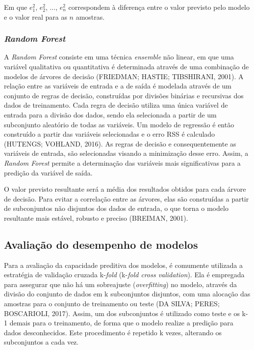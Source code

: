Em que $e_1^2$, $e_2^2$, ..., $e_n^2$ correspondem à diferença entre o valor previsto pelo modelo e o valor real para as $n$ amostras. 

\subsubsection{\textit{Random Forest}}

A \textit{Random Forest} consiste em uma técnica \textit{ensemble} não linear, em que uma variável qualitativa ou quantitativa é determinada através de uma combinação de modelos de árvores de decisão (FRIEDMAN; HASTIE; TIBSHIRANI, 2001). A relação entre as variáveis de entrada e a de saída é modelada através de um conjunto de regras de decisão, construídas por divisões binárias e recursivas dos dados de treinamento. Cada regra de decisão utiliza uma única variável de entrada para a divisão dos dados, sendo ela selecionada a partir de um subconjunto aleatório de todas as variáveis. Um modelo de regressão é então construído a partir das variáveis selecionadas e o erro RSS é calculado (HUTENGS; VOHLAND, 2016). As regras de decisão e consequentemente as variáveis de entrada, são selecionadas visando a minimização desse erro. Assim, a \textit{Random Forest} permite a determinação das variáveis mais significativas para a predição da variável de saída. 

O valor previsto resultante será a média dos resultados obtidos para cada árvore de decisão. Para evitar a correlação entre as árvores, elas são construídas a partir de subconjuntos não disjuntos dos dados de entrada, o que torna o modelo resultante mais estável, robusto e preciso (BREIMAN, 2001).

\subsection{Avaliação do desempenho de modelos}

Para a avaliação da capacidade preditiva dos modelos, é comumente utilizada a estratégia de validação cruzada k-\textit{fold} (k-\textit{fold cross validation}). Ela é empregada para assegurar que não há um sobreajuste (\textit{overfitting}) no modelo, através da divisão do conjunto de dados em k subconjuntos disjuntos, com uma alocação das amostras para o conjunto de treinamento ou teste (DA SILVA; PERES; BOSCARIOLI, 2017). Assim, um dos subconjuntos é utilizado como teste e os k-1 demais para o treinamento, de forma que o modelo realize a predição para dados desconhecidos. Este procedimento é repetido k vezes, alterando os subconjuntos a cada vez.

